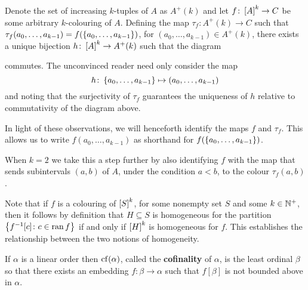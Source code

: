 Denote the set of increasing $k$-tuples of $A$ as $A^+(k)$ and let $f\colon
\subsets{k}{A}\to C$ be some arbitrary $k$-colouring of $A$.  Defining the map
$\tau_f\colon A^+(k)\to C$ such that
$\tau_f(a_0,\dotsc,a_{k-1})=f(\set{a_0,\dotsc,a_{k-1}})$, for
$(a_0,\dotsc,a_{k-1})\in A^+(k)$, there exists a unique bijection $h\colon
\subsets{k}{A}\to A^+(k)$ such that the diagram
\begin{center}
\end{center}
commutes.  The unconvinced reader need only consider the map
\begin{equation}
	h\colon\set{a_0,\dotsc,a_{k-1}}\mapsto(a_0,\dotsc,a_{k-1})
\end{equation}
and noting that the surjectivity of $\tau_f$ guarantees the uniqueness of $h$
relative to commutativity of the diagram above.

\begin{conv}[Colourings]\label{rem:Col}
	In light of these observations, we will henceforth identify the maps $f$ and
	$\tau_f$.  This allows us to write $f(a_0,\dotsc,a_{k-1})$ as
	shorthand for $f(\set{a_0,\dotsc,a_{k-1}})$.

	When $k=2$ we take this a step further by also identifying $f$ with the map
	that sends subintervals $(a,b)$ of $A$, under the condition $a<b$, to the
	colour $\tau_f(a,b)$.
\end{conv}

\begin{rem}[Homogeneity]\label{rem:hom}
	Note that if $f$ is a colouring of $\subsets{k}{S}$, for some nonempty set
	$S$ and some $k\in\posnats$, then it follows by definition that $H\subseteq
	S$ is homogeneous for the partition $\setbuild{f^{-1}[c]}{c\in\range f}$ if
	and only if $\subsets{k}{H}$ is homogeneous for $f$.  This establishes the
	relationship between the two notions of homogeneity.
\end{rem}


\begin{dfn}[Cofinality]
	If $\alpha$ is a linear order then $\cf(\alpha)$, called the
	\textbf{cofinality} of $\alpha$, is the least ordinal $\beta$ so that there
	exists an embedding $f\colon\beta\to\alpha$ such that $f[\beta]$ is not
	bounded above in $\alpha$.
\end{dfn}

